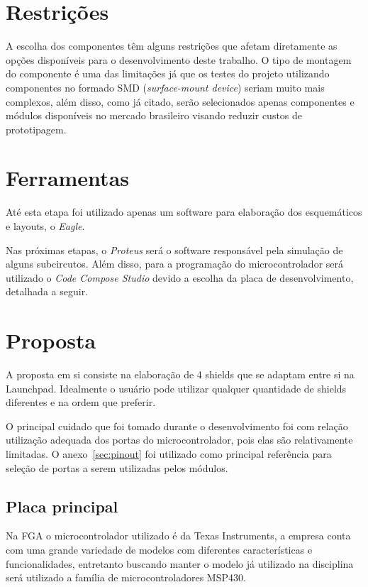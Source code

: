 \section{Restrições}

A escolha dos componentes têm alguns restrições que afetam diretamente as opções disponíveis para o desenvolvimento deste trabalho. O tipo de montagem do componente é uma das limitações já que os testes do projeto utilizando componentes no formado SMD (\textit{surface-mount device}) seriam muito mais complexos, além disso, como já citado, serão selecionados apenas componentes e módulos disponíveis no mercado brasileiro visando reduzir custos de prototipagem.

\section{Ferramentas}

Até esta etapa foi utilizado apenas um software para elaboração dos esquemáticos e layouts, o \textit{Eagle}.

Nas próximas etapas, o \textit{Proteus} será o software responsável pela simulação de alguns subcircutos. Além disso, para a programação do microcontrolador será utilizado o \textit{Code Compose Studio} devido a escolha da placa de desenvolvimento, detalhada a seguir.

\section{Proposta}

A proposta em si consiste na elaboração de 4  shields que se adaptam entre si na Launchpad. Idealmente o usuário pode utilizar qualquer quantidade de shields diferentes e na ordem que preferir.

O principal cuidado que foi tomado durante o desenvolvimento foi com relação utilização adequada dos portas do microcontrolador, pois elas são relativamente limitadas. O anexo~\ref{sec:pinout} foi utilizado como principal referência para seleção de portas a serem utilizadas pelos módulos.

\subsection{Placa principal}

Na FGA o microcontrolador utilizado é da Texas Instruments, a empresa conta com uma grande variedade de modelos com diferentes características e funcionalidades, entretanto buscando manter o modelo já utilizado na disciplina será utilizado a família de microcontroladores MSP430.

